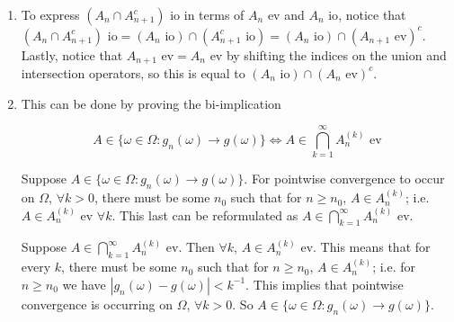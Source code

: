 \documentclass[12pt]{article}
\begin{document}
\begin{enumerate}
\item To express $(A_n \cap A_{n+1}^c)\mbox{ io}$ in terms of $A_n\mbox{ ev}$ and $A_n\mbox{ io}$, notice that $(A_n \cap A_{n+1}^c)\mbox{ io} = (A_n \mbox{ io}) \cap (A_{n+1}^c\mbox{ io}) = (A_n \mbox{ io}) \cap (A_{n+1}\mbox{ ev})^c$. Lastly, notice that $A_{n+1}\mbox{ ev} = A_{n}\mbox{ ev}$ by shifting the indices on the union and intersection operators, so this is equal to $(A_n \mbox{ io}) \cap (A_{n}\mbox{ ev})^c$.

\item This can be done by proving the bi-implication 

$$A \in \{\omega \in \Omega : g_n(\omega) \to g(\omega)\} \Leftrightarrow A \in \bigcap^{\infty}_{k=1} A_n^{(k)}\mbox{ ev}$$

Suppose $A \in \{\omega \in \Omega : g_n(\omega) \to g(\omega)\}$. For pointwise convergence to occur on $\Omega$, $\forall k>0$, there must be some $n_0$ such that for $n\geq n_0$, $A \in A_n^{(k)}$; i.e. $A\in  A_n^{(k)}\mbox{ ev}$ $\forall k$. This last can be reformulated as $A \in \bigcap^{\infty}_{k=1} A_n^{(k)}\mbox{ ev}$.

Suppose $A \in \bigcap^{\infty}_{k=1} A_n^{(k)}\mbox{ ev}$. Then $\forall k$, $A\in  A_n^{(k)}\mbox{ ev}$. This means that for every $k$, there must be some $n_0$ such that for $n\geq n_0$, $A \in A_n^{(k)}$; i.e. for $n \geq n_0$ we have $|g_n(\omega)-g(\omega)|<k^{-1}$. This implies that pointwise convergence is occurring on $\Omega$, $\forall k>0$. So $A \in \{\omega \in \Omega : g_n(\omega) \to g(\omega)\}$.

\end{enumerate}
\end{document}
